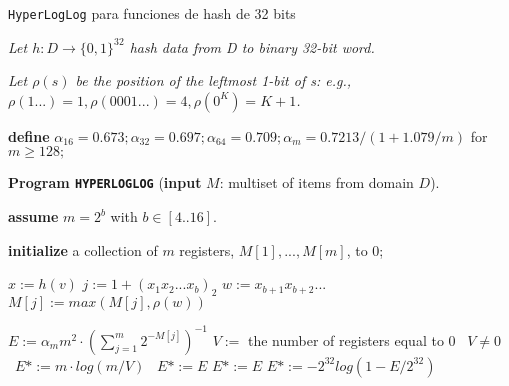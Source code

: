 \begin{algorithm}[h!]
\caption{\texttt{HyperLogLog} para funciones de hash de 32 bits}
\textit{Let $h: D\rightarrow \{0,1\}^{32}$ hash data from D to binary 32-bit word.}

\textit{Let $\rho(s)$ be the position of the leftmost 1-bit of s: e.g.,
$\rho(1...) = 1, \rho(0001...) = 4, \rho(0^K) = K + 1$.}

\textbf{define} $\alpha_{16}=0.673;\alpha_{32}=0.697;\alpha_{64}=0.709;\alpha_m=0.7213/(1+1.079/m)$
for $m \geq 128;$

\textbf{Program \texttt{HYPERLOGLOG}} (\textbf{input} $M$: multiset of items from domain $D$).

\textbf{assume} $m=2^b$ with $ b\in[4..16]$.

\textbf{initialize} a collection of $m$ registers, $M[1],...,M[m]$, to 0;

\begin{algorithmic}
            \STATE $x  := h(v)$
            \STATE $j   := 1 + (x_1 x_2 ... x_b)_2$ 
            \STATE $w := x_{b+1} x_{b+2} ... $
            \STATE $M[j] := max(M[j],\rho(w))$
    \ENDFOR

    \STATE $E:=\alpha _m m^2·\left(\sum\limits_{j=1}^m 2^{-M[j]}\right)^{-1}$ 
        \STATE $V :=$ the number of registers equal to $0$
        \STATE \algorithmicif\ $V \neq 0$ \algorithmicthen\ $E* := m \cdot log(m / V)$ \algorithmicelse\ $E* := E$
    \ENDIF
        \STATE $E*:=E$ 
    \ELSE
        \STATE $E* := -2^{32}log(1-E/2^{32})$ 
    \ENDIF
\end{algorithmic}
\end{algorithm}
